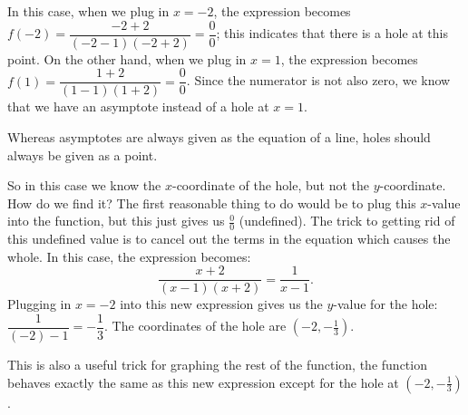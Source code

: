 \documentclass[lang=en,11pt]{elegantbook}
\begin{document}
In this case, when we plug in $x=-2$, the expression becomes $f(-2)=\dfrac{-2+2}{(-2-1)(-2+2)}=\dfrac{0}{0}$; this indicates that there is a hole at this point.  On the other hand, when we plug in $x=1$, the expression becomes $f(1)=\dfrac{1+2}{(1-1)(1+2)}=\dfrac{0}{0}$. Since the numerator is not also zero, we know that we have an asymptote instead of a hole at $x=1$.
\begin{note}
Whereas asymptotes are always given as the equation of a line, holes should always be given as a point.
\end{note}
So in this case we know the $x$-coordinate of the hole, but not the $y$-coordinate. How do we find it? The first reasonable thing to do would be to plug this $x$-value into the function, but this just gives us $\frac{0}{0}$ (undefined). The trick to getting rid of this undefined value is to cancel out the terms in the equation which causes the whole. In this case, the expression becomes: $$\dfrac{x+2}{(x-1)(x+2)}=\dfrac{1}{x-1}.$$
Plugging in $x=-2$ into this new expression gives us the $y$-value for the hole: $\dfrac{1}{(-2)-1}=-\dfrac{1}{3}$. The coordinates of the hole are $(-2,-\frac{1}{3})$.

This is also a useful trick for graphing the rest of the function, the function behaves exactly the same as this new expression except for the hole at $(-2,-\frac{1}{3})$.
\end{document}
